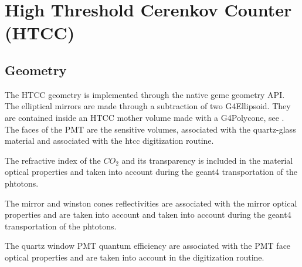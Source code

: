 \section{High Threshold Cerenkov Counter (HTCC)}

\subsection{Geometry}

The HTCC geometry is implemented through the native gemc geometry API. The elliptical mirrors are made through a subtraction of
two G4Ellipsoid. They are contained inside an HTCC mother volume made with a G4Polycone, see .
The faces of the PMT are the sensitive volumes, associated with the quartz-glass material and associated with the htcc digitization routine.

The refractive index of the $CO_2$ and its transparency is included in the material optical properties and taken
into account during the geant4 transportation of the phtotons.

The mirror and winston cones reflectivities are associated with the mirror optical properties and are taken into
account and taken into account during the geant4 transportation of the phtotons.

The quartz window PMT quantum efficiency are associated with the PMT face optical properties and are taken into account in
the digitization routine.


